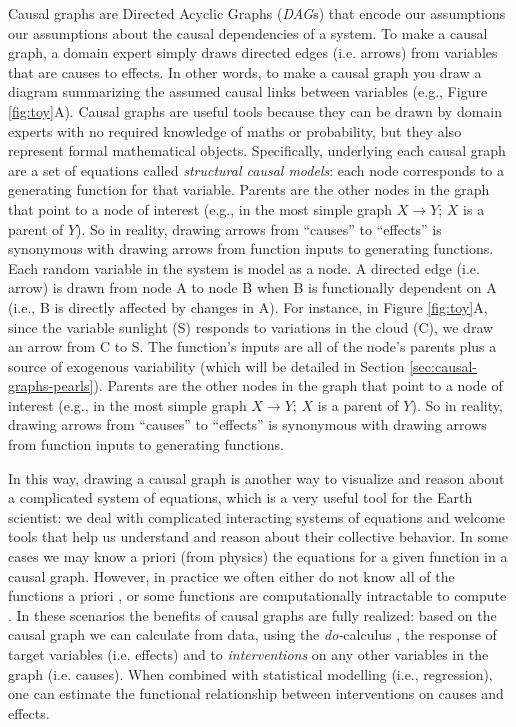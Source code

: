 \documentclass[12pt]{article}
\begin{document}
Causal graphs are Directed Acyclic Graphs (\emph{DAG}s) that encode
our assumptions our assumptions about the causal dependencies of a
system. To make a causal graph, a domain expert simply draws directed
edges (i.e. arrows) from variables that are causes to effects. In
other words, to make a causal graph you draw a diagram summarizing the
assumed causal links between variables (e.g., Figure
\ref{fig:toy}A). Causal graphs are useful tools because they can be
drawn by domain experts with no required knowledge of maths or
probability, but they also represent formal mathematical
objects. Specifically, underlying each causal graph are a set of
equations called \emph{structural causal models}: each node
corresponds to a generating function for that variable. Parents are
the other nodes in the graph that point to a node of interest (e.g.,
in the most simple graph $X \to Y$; $X$ is a parent of $Y$). So in
reality, drawing arrows from ``causes'' to ``effects'' is synonymous
with drawing arrows from function inputs to generating functions. Each
random variable in the system is model as a node. A directed edge
(i.e. arrow) is drawn from node A to node B when B is functionally
dependent on A (i.e., B is directly affected by changes in A). For
instance, in Figure \ref{fig:toy}A, since the variable sunlight (S)
responds to variations in the cloud (C), we draw an arrow from C to
S. The function's inputs are all of the node's parents plus a source
of exogenous variability (which will be detailed in Section
\ref{sec:causal-graphs-pearls}). Parents are the other nodes in the
graph that point to a node of interest (e.g., in the most simple graph
$X \to Y$; $X$ is a parent of $Y$). So in reality, drawing arrows from
``causes'' to ``effects'' is synonymous with drawing arrows from
function inputs to generating functions.

In this way, drawing a causal graph is another way to visualize and
reason about a complicated system of equations, which is a very useful
tool for the Earth scientist: we deal with complicated interacting
systems of equations and welcome tools that help us understand and
reason about their collective behavior. In some cases we may know a
priori (from physics) the equations for a given function in a causal
graph. However, in practice we often either do not know all of the
functions a priori \citep[e.g., plant stomata response to
VPD;][]{massmann2019, zhou2019arid, zhou2019feedback, grossiord2020},
or some functions are computationally intractable to compute
\citep[e.g., turbulence, moist convection, and cloud microphysics in
large scale models;][]{zadra2018,gentine2018}. In these scenarios the benefits of
causal graphs are fully realized: based on the causal graph we can
calculate from data, using the \textit{do-}calculus
\citep{pearl-1994-do-calculus}, the response of target variables
(i.e. effects) and to \textit{interventions} on any other variables in
the graph (i.e. causes). When combined with statistical modelling
(i.e., regression), one can estimate the functional relationship
between interventions on causes and effects.
\end{document}
